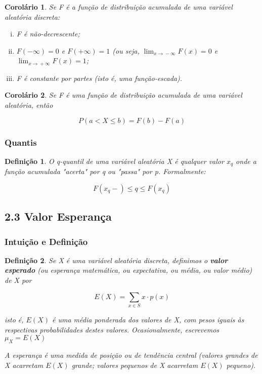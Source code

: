\documentclass[12pt]{article}
\newtheorem{corollary}{Corolário}[theorem]
\newtheorem{definition}{Definição}
\begin{document}
\begin{corollary}
Se F é a função de distribuição acumulada de uma variável aleatória discreta:

\begin{enumerate}[i.]
    \item F é não-decrescente;
    \item $F(- \infty) = 0$ e $F(+ \infty) = 1$ (ou seja, $\lim_{x\rightarrow{} - \infty} F(x) = 0$ e $\lim_{x\rightarrow{} + \infty} F(x) = 1$;
    \item F é constante por partes (isto é, uma função-escada).
\end{enumerate}
\end{corollary}

\begin{corollary}
Se F é uma função de distribuição acumulada de uma variável aleatória, então

$$P(a < X \leq b) = F(b) - F(a)$$
\end{corollary}

\subsubsection*{Quantis}
\begin{definition}
O q-quantil de uma variável aleatória X é qualquer valor $x_q$ onde a função acumulada "acerta" por q ou "passa" por p. Formalmente:

$$F(x_q -) \leq q \leq F(x_q)$$
\end{definition}

\subsection*{2.3 Valor Esperança}
\subsubsection*{Intuição e Definição}
\begin{definition}
Se X é uma variável aleatória discreta, definimos o \textbf{valor esperado} (ou esperança matemática, ou expectativa, ou média, ou valor médio) de X por

$$E(X) = \sum_{x \in S} x \cdot p(x)$$

isto é, $E(X)$ é uma média ponderada dos valores de X, com pesos iguais às respectivas probabilidades destes valores. Ocasionalmente, escrevemos $\mu_X = E(X)$

A esperança é uma medida de posição ou de tendência central (valores grandes de X acarretam $E(X)$ grande; valores pequenos de X acarretam $E(X)$ pequeno).
\end{definition}
\end{document}
